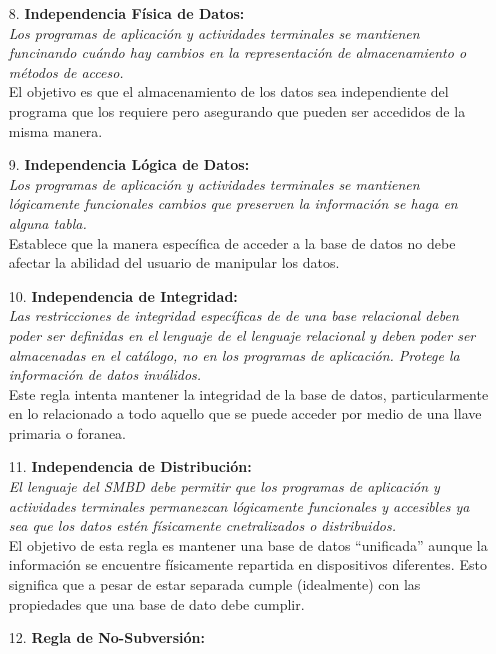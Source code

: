 \documentclass[a4paper, 12pt]{report}
\begin{document}
{\begin{enumerate}
{    Esta regla establece que la información debe ser manipulada cómo conjuntos,
    lo que ayuda a garantizar la consistencia de la base de datos.
}
\item[8.]{\textbf{Independencia Física de Datos:}\\\textit{
    Los programas de aplicación y actividades terminales se mantienen funcinando
    cuándo hay cambios en la representación de almacenamiento o métodos de
    acceso.}\\
    El objetivo es que el almacenamiento de los datos sea independiente del
    programa que los requiere pero asegurando que pueden ser accedidos de la
    misma manera.
}
\item[9.]{\textbf{Independencia Lógica de Datos:}\\\textit{
    Los programas de aplicación y actividades terminales se mantienen lógicamente
    funcionales cambios que preserven la información se haga en alguna tabla.}\\
    Establece que la manera específica de acceder a la base de datos no debe afectar
    la abilidad del usuario de manipular los datos.
}
\item[10.]{\textbf{Independencia de Integridad:}\\\textit{
    Las restricciones de integridad específicas de de una base relacional deben
    poder ser definidas en el lenguaje de el lenguaje relacional y deben poder
    ser almacenadas en el catálogo, no en los programas de aplicación. Protege la
    información de datos inválidos.}\\
    Este regla intenta mantener la integridad de la base de datos, particularmente
    en lo relacionado a todo aquello que se puede acceder por medio de una llave
    primaria o foranea.
}
\item[11.]{\textbf{Independencia de Distribución:}\\\textit{
    El lenguaje del SMBD debe permitir que los programas de aplicación y actividades
    terminales permanezcan lógicamente funcionales y accesibles ya sea que los datos
    estén físicamente cnetralizados o distribuidos.}\\
    El objetivo de esta regla es mantener una base de datos ``unificada'' aunque
    la información se encuentre físicamente repartida en dispositivos diferentes.
    Esto significa que a pesar de estar separada cumple (idealmente) con las
    propiedades que una base de dato debe cumplir.
}
\item[12.]{\textbf{Regla de No-Subversión:}\\\textit{
}}
\end{enumerate}}
\end{document}
